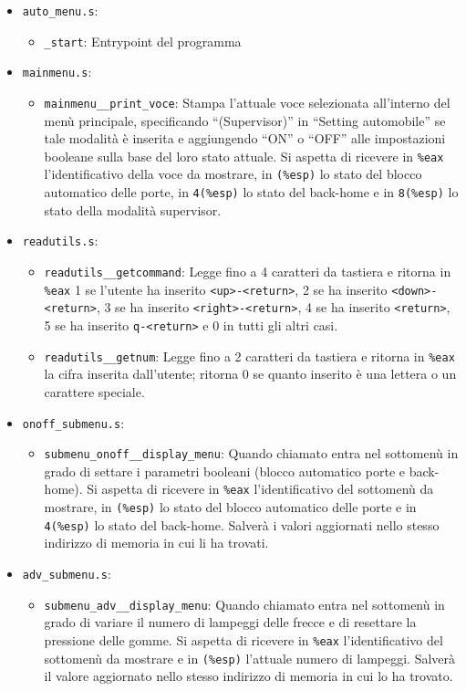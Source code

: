 \documentclass[
  12pt,
  a4paper,
  headings=optiontoheadandtoc
]{scrreprt}
\begin{document}
\begin{itemize}
\item \texttt{auto\_menu.s}:
  \begin{itemize}
  \item \texttt{\_start}: Entrypoint del programma
  \end{itemize}
\item \texttt{mainmenu.s}:
  \begin{itemize}
  \item \texttt{mainmenu\_\_print\_voce}: Stampa l'attuale voce selezionata all'interno del menù principale, specificando ``(Supervisor)'' in ``Setting automobile'' se tale modalità è inserita e aggiungendo ``ON'' o ``OFF'' alle impostazioni booleane sulla base del loro stato attuale. Si aspetta di ricevere in \texttt{\%eax} l'identificativo della voce da mostrare, in \texttt{(\%esp)} lo stato del blocco automatico delle porte, in \texttt{4(\%esp)} lo stato del back-home e in \texttt{8(\%esp)} lo stato della modalità supervisor.
  \end{itemize}
\item \texttt{readutils.s}:
  \begin{itemize}
  \item \texttt{readutils\_\_getcommand}: Legge fino a 4 caratteri da tastiera e ritorna in \texttt{\%eax} 1 se l'utente ha inserito \texttt{<up>-<return>}, 2 se ha inserito \texttt{<down>-<return>}, 3 se ha inserito \texttt{<right>-<return>}, 4 se ha inserito \texttt{<return>}, 5 se ha inserito \texttt{q-<return>} e 0 in tutti gli altri casi.
    \item \texttt{readutils\_\_getnum}: Legge fino a 2 caratteri da tastiera e ritorna in \texttt{\%eax} la cifra inserita dall'utente; ritorna 0 se quanto inserito è una lettera o un carattere speciale.
  \end{itemize}
\item \texttt{onoff\_submenu.s}:
  \begin{itemize}
  \item \texttt{submenu\_onoff\_\_display\_menu}: Quando chiamato entra nel sottomenù in grado di settare i parametri booleani (blocco automatico porte e back-home). Si aspetta di ricevere in \texttt{\%eax} l'identificativo del sottomenù da mostrare, in \texttt{(\%esp)} lo stato del blocco automatico delle porte e in \texttt{4(\%esp)} lo stato del back-home. Salverà i valori aggiornati nello stesso indirizzo di memoria in cui li ha trovati.
  \end{itemize}
\item \texttt{adv\_submenu.s}:
  \begin{itemize}
  \item \texttt{submenu\_adv\_\_display\_menu}: Quando chiamato entra nel sottomenù in grado di variare il numero di lampeggi delle frecce e di resettare la pressione delle gomme. Si aspetta di ricevere in \texttt{\%eax} l'identificativo del sottomenù da mostrare e in \texttt{(\%esp)} l'attuale numero di lampeggi. Salverà il valore aggiornato nello stesso indirizzo di memoria in cui lo ha trovato.
  \end{itemize}
\end{itemize}
\end{document}
